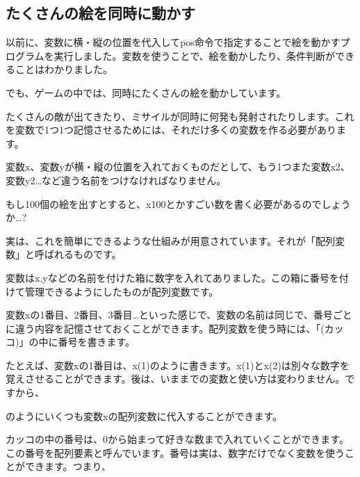 \newpage
\subsection{たくさんの絵を同時に動かす}

以前に、変数に横・縦の位置を代入してpos命令で指定することで絵を動かすプログラムを実行しました。変数を使うことで、絵を動かしたり、条件判断ができることはわかりました。

でも、ゲームの中では、同時にたくさんの絵を動かしています。

たくさんの敵が出てきたり、ミサイルが同時に何発も発射されたりします。これを変数で1つ1つ記憶させるためには、それだけ多くの変数を作る必要があります。

変数x、変数yが横・縦の位置を入れておくものだとして、もう1つまた変数x2、変数y2…など違う名前をつけなければなりません。

もし100個の絵を出すとすると、x100とかすごい数を書く必要があるのでしょうか…?


実は、これを簡単にできるような仕組みが用意されています。それが「配列変数」と呼ばれるものです。

変数はx,yなどの名前を付けた箱に数字を入れてありました。この箱に番号を付けて管理できるようにしたものが配列変数です。

変数xの1番目、2番目、3番目…といった感じで、変数の名前は同じで、番号ごとに違う内容を記憶させておくことができます。配列変数を使う時には、「(カッコ)」の中に番号を書きます。


\begin{description}
    \item {}
\end{description}

たとえば、変数xの1番目は、x(1)のように書きます。x(1)とx(2)は別々な数字を覚えさせることができます。後は、いままでの変数と使い方は変わりません。ですから、



\begin{description}
    \item {}
    \item {}
    \item {}
\end{description}


のようにいくつも変数xの配列変数に代入することができます。

カッコの中の番号は、0から始まって好きな数まで入れていくことができます。この番号を配列要素と呼んでいます。番号は実は、数字だけでなく変数を使うことができます。つまり、

